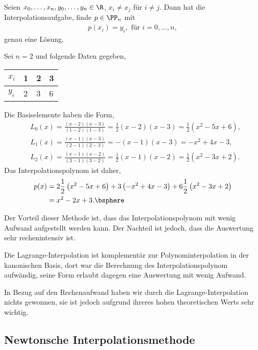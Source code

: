 \addtocounter{prop}{1}
\begin{cor}
\label{prop:3.2}
Seien $x_0,\ldots,x_n,y_0,\ldots,y_n\in\R$, $x_i\neq x_j$ für $i\neq j$. Dann
hat die Interpolationsaufgabe,
finde $p\in\PP_n$ mit
\begin{align*}
p(x_i) = y_i,\text{ für } i=0,\ldots,n,
\end{align*}
genau eine Lösung.\fishhere
\end{cor}

\begin{bspn}
Sei $n = 2$ und folgende Daten gegeben,
 
\begin{tabular}[h]{l|lll}
$x_i$ & 1 & 2 & 3\\\hline
$y_i$ & 2 & 3 & 6
\end{tabular}

Die Basiselemente haben die Form,
\begin{align*}
&L_0(x) = \frac{(x-2)(x-3)}{(1-2)(1-3)} = \frac{1}{2}(x-2)(x-3) =
\frac{1}{2}\left( x^2 -5x + 6\right),\\
&L_1(x) = \frac{(x-1)(x-3)}{(2-1)(2-3)} =
-(x-1)(x-3)
= -x^2 +4x-3,\\
&L_2(x) = \frac{(x-1)(x-2)}{(3-1)(3-2)} = \frac{1}{2}(x-1)(x-2) =
\frac{1}{2}\left(x^2 - 3x +2\right).
\end{align*}
Das Interpolationspolynom ist daher,
\begin{align*}
p(x) &= 2\frac{1}{2}\left(x^2-5x+6\right) + 3\left(-x^2+4x-3\right)
+ 6\frac{1}{2}\left(x^2-3x+2\right)\\
&=x^2-2x+3.\bsphere
\end{align*}
\end{bspn}
Der Vorteil dieser Methode ist, dass das Interpolationspolynom mit wenig
Aufwand aufgestellt werden kann. Der Nachteil ist jedoch, dass die Auswertung
sehr rechenintensiv ist.

Die Lagrange-Interpolation ist komplementär zur Polynominterpolation in der
kanonischen Basis, dort war die Berechnung des Interpolationspolynom aufwändig,
seine Form erlaubt dagegen eine Auswertung mit wenig Aufwand.

In Bezug auf den Rechenaufwand haben wir durch die Lagrange-Interpolation
nichts gewonnen, sie ist jedoch aufgrund ihreres hohen theoretischen Werts sehr
wichtig.

\subsection{Newtonsche Interpolationsmethode} 

